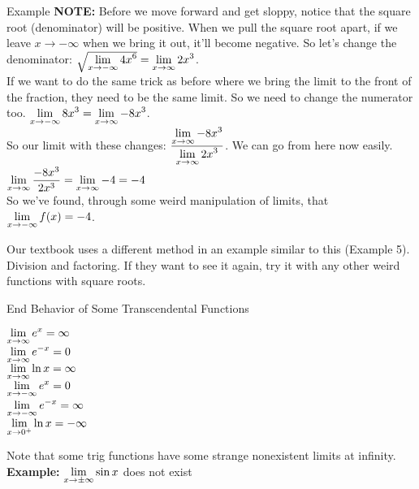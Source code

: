 \begin{note}{Example}
\textbf{NOTE:} Before we move forward and get sloppy, notice that the square root (denominator) will be positive. When we pull the square root apart, if we leave $x\to-\infty$ when we bring it out, it'll become negative. So let's change the denominator: $\sqrt{\displaystyle \lim_{x\to-\infty}4x^6} = \displaystyle \lim_{x\to\infty}2x^3$.\\

If we want to do the same trick as before where we bring the limit to the front of the fraction, they need to be the same limit. So we need to change the numerator too. $\displaystyle \lim_{x\to-\infty} 8x^3 = \displaystyle \lim_{x\to\infty}-8x^3$.\\

So our limit with these changes: $\dfrac{\displaystyle \lim_{x\to\infty}-8x^3}{\displaystyle \lim_{x\to\infty}2x^3}$. We can go from here now easily.\\

$\displaystyle \lim_{x\to\infty}\dfrac{-8x^3}{2x^3}=\displaystyle \lim_{x\to\infty}-4=-4$\\

So we've found, through some weird manipulation of limits, that $\displaystyle \lim_{x\to-\infty} f(x) = -4$.
\end{note}

Our textbook uses a different method in an example similar to this (Example 5). Division and factoring. If they want to see it again, try it with any other weird functions with square roots.

\begin{defn}{End Behavior of Some Transcendental Functions}
  \hspace{2cm}
\begin{multicols}{2}
$\displaystyle \lim_{x\to \infty} e^x = \infty$\\

$\displaystyle \lim_{x\to \infty} e^{-x} = 0$\\

$\displaystyle \lim_{x\to \infty} \ln x = \infty$\\

$\displaystyle \lim_{x\to -\infty} e^x = 0$\\

$\displaystyle \lim_{x\to -\infty} e^{-x} = \infty$\\

$\displaystyle \lim_{x\to 0^+} \ln x = -\infty$\\

\end{multicols}
\end{defn}

Note that some trig functions have some strange nonexistent limits at infinity.\\
\textbf{Example:} $\displaystyle \lim_{x\to\pm\infty} \sin x$ does not exist

